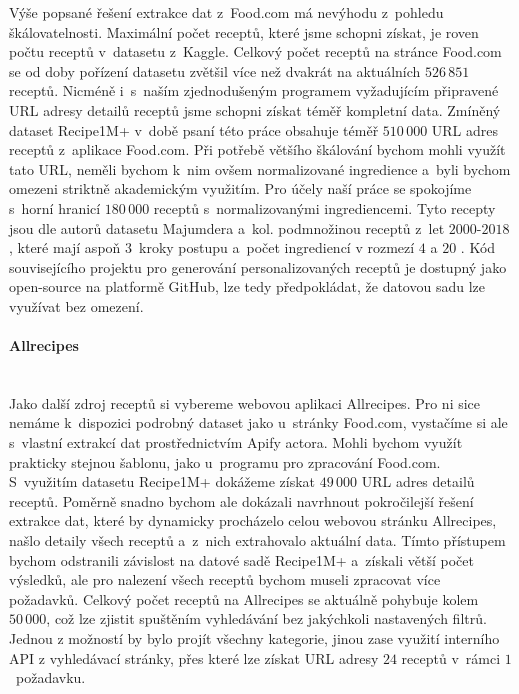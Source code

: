 Výše popsané řešení extrakce dat z~Food.com má nevýhodu z~pohledu škálovatelnosti. Maximální počet receptů, které jsme schopni získat, je roven počtu receptů v~datasetu z~Kaggle. Celkový počet receptů na stránce Food.com se od doby pořízení datasetu zvětšil více než dvakrát na aktuálních $526\,851$ receptů. Nicméně i~s~naším zjednodušeným programem vyžadujícím připravené URL adresy detailů receptů jsme schopni získat téměř kompletní data. Zmíněný dataset Recipe1M+ v~době psaní této práce obsahuje téměř $510\,000$ URL adres receptů z~aplikace Food.com. Při potřebě většího škálování bychom mohli využít tato URL, neměli bychom k~nim ovšem normalizované ingredience a~byli bychom omezeni striktně akademickým využitím. Pro účely naší práce se spokojíme s~horní hranicí $180\,000$ receptů s~normalizovanými ingrediencemi. Tyto recepty jsou dle autorů datasetu Majumdera a~kol. podmnožinou receptů z~let $2000$-$2018$, které mají aspoň $3$~kroky postupu a~počet ingrediencí v rozmezí $4$ a $20$ \citep{majumder-etal-2019-generating}. Kód souvisejícího projektu pro generování personalizovaných receptů je dostupný jako open-source na platformě GitHub, lze tedy předpokládat, že datovou sadu lze využívat bez omezení.

\paragraph{Allrecipes}\mbox{}\\

Jako další zdroj receptů si vybereme webovou aplikaci Allrecipes. Pro ni sice nemáme k~dispozici podrobný dataset jako u~stránky Food.com, vystačíme si ale s~vlastní extrakcí dat prostřednictvím Apify actora. Mohli bychom využít prakticky stejnou šablonu, jako u~programu pro zpracování Food.com. S~využitím datasetu Recipe1M+ dokážeme získat $49\,000$ URL adres detailů receptů. Poměrně snadno bychom ale dokázali navrhnout pokročilejší řešení extrakce dat, které by dynamicky procházelo celou webovou stránku Allrecipes, našlo detaily všech receptů a~z~nich extrahovalo aktuální data. Tímto přístupem bychom odstranili závislost na datové sadě Recipe1M+ a~získali větší počet výsledků, ale pro nalezení všech receptů bychom museli zpracovat více požadavků. Celkový počet receptů na Allrecipes se aktuálně pohybuje kolem $50\,000$, což lze zjistit spuštěním vyhledávání bez jakýchkoli nastavených filtrů. Jednou z možností by bylo projít všechny kategorie, jinou zase využití interního API z vyhledávací stránky, přes které lze získat URL adresy $24$ receptů v~rámci $1$~požadavku.


